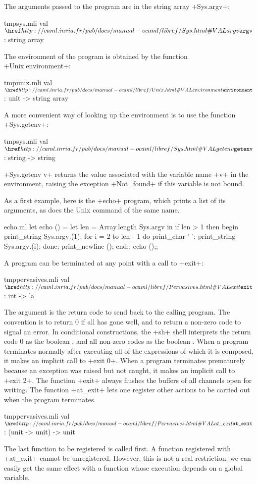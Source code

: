 The arguments passed to the program are in the string array
\ml+Sys.argv+:
%
\begin{listingcodefile}{tmpsys.mli}
val $\indexlibvalue{Sys}{argv}$ : string array
\end{listingcodefile}
%
The environment of the program is obtained by the function
\ml+Unix.environment+:
%
\begin{listingcodefile}{tmpunix.mli}
val $\indexlibvalue{Unix}{environment}$ : unit -> string array
\end{listingcodefile}
%
A more convenient way of looking up the environment is to use the
function \ml+Sys.getenv+:
%
\begin{listingcodefile}{tmpsys.mli}
val $\indexlibvalue{Sys}{getenv}$ : string -> string
\end{listingcodefile}
%
\ml+Sys.getenv v+ returns the value associated with the variable name
\ml+v+ in 
the environment, raising the exception  \ml+Not_found+ if this 
variable is not bound.
%
\begin{example}
As a first example, here is the \ml+echo+ program, which prints a
list of its arguments, as does the Unix command of the same name.
\begin{listingcodefile}{echo.ml}
let echo () = 
  let len = Array.length Sys.argv in
  if len > 1 then 
    begin
      print_string Sys.argv.(1); 
      for i = 2 to len - 1 do 
        print_char ' ';
        print_string Sys.argv.(i); 
      done;
      print_newline ();
    end;;
echo ();;
\end{listingcodefile}
\end{example}

A program can be terminated at any point with a call to \ml+exit+:
%
\begin{listingcodefile}{tmppervasives.mli}
val $\indexlibvalue{Pervasives}{exit}$ : int -> 'a
\end{listingcodefile}
%
The argument is the return code to send back to the calling program. The
convention is to return 0 if all has gone well, and to return a
non-zero code to signal an error. In conditional constructions, the
\ml+sh+ shell interprets the return code 0 as the boolean
, and all non-zero codes as the boolean .
%
When a program terminates normally after executing all of the
expressions of which it is composed, it makes an implicit call to
\ml+exit 0+. When a program terminates prematurely because an
exception was raised but not caught, it makes an implicit call to
\ml+exit 2+.
%
The function \ml+exit+ always flushes the buffers of all channels open for
writing. The function \ml+at_exit+ lets one register other actions
to be carried out when the program terminates.
%
\begin{listingcodefile}{tmppervasives.mli}
val $\indexlibvalue{Pervasives}{at\_exit}$ : (unit -> unit) -> unit
\end{listingcodefile}
%
The last function to be registered is called first. A function registered with
\ml+at_exit+ cannot be unregistered. However, this is not a
real restriction: we can easily get the same effect with a function
whose execution depends on a global variable.


